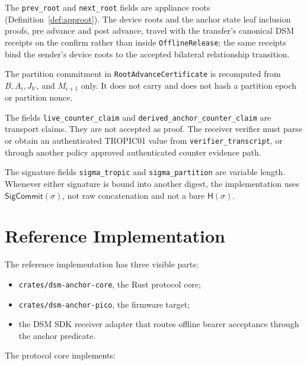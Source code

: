 \documentclass[11pt]{article}
\theoremstyle{definition}
\theoremstyle{remark}
\newcommand{\Hf}{\ensuremath{\mathsf{H}}}
\newcommand{\SigCommit}{\ensuremath{\mathsf{SigCommit}}}
\newcommand{\Bundle}{\ensuremath{B}}
\newcommand{\Ahead}{\ensuremath{A}}
\newcommand{\Bhead}{\ensuremath{J}}
\begin{document}
The \texttt{prev\_root} and \texttt{next\_root} fields are appliance roots
(Definition~\ref{def:approot}). The device roots and the anchor state leaf inclusion proofs, pre
advance and post advance, travel with the transfer's canonical DSM receipts on the confirm rather
than inside \texttt{OfflineRelease}; the same receipts bind the sender's device roots to the
accepted bilateral relationship transition.

The partition commitment in \texttt{RootAdvanceCertificate} is recomputed from
\(\Bundle,\Ahead_i,\Bhead_{b'}\), and \(M_{i+1}\) only. It does not carry and does not
hash a partition epoch or partition nonce.

The fields \texttt{live\_counter\_claim} and \texttt{derived\_anchor\_counter\_claim} are
transport claims. They are not accepted as proof. The receiver verifier must parse or obtain an
authenticated TROPIC01 value from \texttt{verifier\_transcript}, or through another policy
approved authenticated counter evidence path.

The signature fields \texttt{sigma\_tropic} and \texttt{sigma\_partition} are variable length.
Whenever either signature is bound into another digest, the implementation uses
\(\SigCommit(\sigma)\), not raw concatenation and not a bare \(\Hf(\sigma)\).

\section{Reference Implementation}

The reference implementation has three visible parts:

\begin{itemize}
\item \texttt{crates/dsm-anchor-core}, the Rust protocol core;
\item \texttt{crates/dsm-anchor-pico}, the firmware target;
\item the DSM SDK receiver adapter that routes offline bearer acceptance through the anchor
predicate.
\end{itemize}

The protocol core implements:
\end{document}
